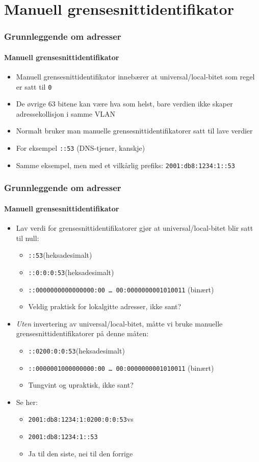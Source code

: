 \section{Manuell grensesnittidentifikator}
\begin{frame}%
  \frametitle{Grunnleggende om adresser}
  \framesubtitle{Manuell grensesnittidentifikator}
  \pause
  \begin{itemize}[<+->]
  \item Manuell grensesnittidentifikator innebærer at
    universal/local-bitet som regel er satt til \texttt{0}
  \item De øvrige 63 bitene kan være hva som helst, bare verdien ikke
    skaper adressekollisjon i samme VLAN
  \item Normalt bruker man manuelle grensesnittidentifikatorer satt
    til lave verdier
  \item For eksempel \texttt{::53} \hfill(DNS-tjener, kanskje)
  \item Samme eksempel, men med et vilkårlig prefiks:
    \texttt{2001:db8:1234:1::\alert{53}}
  \end{itemize}
\end{frame}

\begin{frame}%
  \frametitle{Grunnleggende om adresser}
  \framesubtitle{Manuell grensesnittidentifikator}
  \begin{itemize}[<+->]
  \item Lav verdi for grensesnittidentifikatorer gjør at
    universal/local-bitet blir satt til null:
    \begin{itemize}[<+->]
    \item \texttt{::53}\hfill(heksadesimalt)
    \item \texttt{::\alert{0}:0:0:53}\hfill(heksadesimalt)
    \item \texttt{::000000\alert{0}000000000:00~\dots~00:0000000001010011}
      \hfill(binært)
    \item Veldig praktisk for lokalgitte adresser, ikke sant?
    \end{itemize}
  \item \textit{Uten\/} invertering av universal/local-bitet, måtte vi
    bruke manuelle grensesnittidentifikatorer på denne måten:
    \begin{itemize}[<+->]
    \item \texttt{::0\alert{2}00:0:0:53}\hfill(heksadesimalt)
    \item \texttt{::000000\alert{1}000000000:00~\dots~00:0000000001010011}
      \hfill(binært)
    \item Tungvint og upraktisk, ikke sant?
    \end{itemize}
  \item Se her:
    \begin{itemize}[<+->]
    \item \texttt{2001:db8:1234:1:0200:0:0:53}\quad vs
    \item \texttt{2001:db8:1234:1::53}
    \item Ja til den siste, nei til den forrige
    \end{itemize}
  \end{itemize}
\end{frame}

